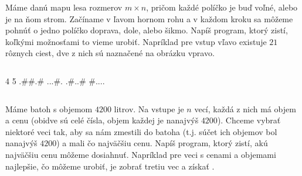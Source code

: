 \begin{uloha}
  Máme danú mapu lesa rozmerov $m\times n$, pričom každé políčko je buď voľné,
  alebo je na ňom strom. Začíname v ľavom hornom rohu a v každom kroku sa môžeme
  pohnúť o jedno políčko doprava, dole, alebo šikmo. Napíš program, ktorý zistí,
  koľkými možnosťami to vieme urobiť. Napríklad pre vstup vľavo existuje $21$ rôznych ciest,
  dve z nich sú naznačené na obrázku vpravo.
  
\begin{column}{0.45}
\begin{outputBox}
4 5
.##.#
...#.
.#..#
#....
\end{outputBox}
\end{column}\hfill\begin{column}{0.45}
\end{column}
\end{uloha}

\begin{uloha}
  Máme batoh s objemom $4200$ litrov. Na vstupe je $n$ vecí, každá z nich má objem
  a cenu (obidve sú celé čísla, objem každej je nanajvýš $4200$). 
  Chceme vybrať niektoré veci tak, aby sa nám zmestili
  do batoha (t.j. súčet ich objemov bol nanajvýš $4200$) a mali čo najväčšiu cenu.
  Napíš program, ktorý zistí, akú najväčšiu cenu môžeme dosiahnuť.
  Napríklad pre veci s cenami  a objemami 
  najlepšie, čo môžeme urobiť, je zobrať tretiu vec a získať .
\end{uloha}

